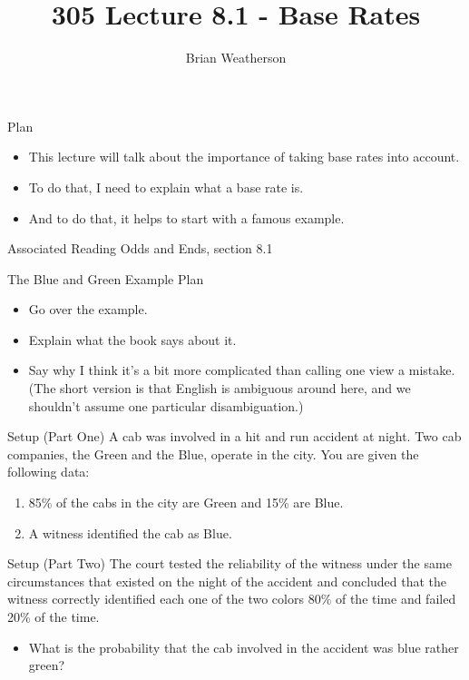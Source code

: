 \documentclass[
  ignorenonframetext,
]{beamer}
\title{305 Lecture 8.1 - Base Rates}
\author{Brian Weatherson}
\date{}
\providecommand{\tightlist}{%
  \setlength{\itemsep}{0pt}\setlength{\parskip}{0pt}}
\renewcommand{\,}{\text{, }}
\begin{document}
\frame{\titlepage}

\begin{frame}{Plan}
\protect\hypertarget{plan}{}
\begin{itemize}
\tightlist
\item
  This lecture will talk about the importance of taking base rates into
  account.
\item
  To do that, I need to explain what a base rate is.
\item
  And to do that, it helps to start with a famous example.
\end{itemize}
\end{frame}

\begin{frame}{Associated Reading}
\protect\hypertarget{associated-reading}{}
Odds and Ends, section 8.1
\end{frame}

\begin{frame}{The Blue and Green Example}
\protect\hypertarget{the-blue-and-green-example}{}
Plan

\begin{itemize}
\tightlist
\item
  Go over the example.
\item
  Explain what the book says about it.
\item
  Say why I think it's a bit more complicated than calling one view a
  mistake. (The short version is that English is ambiguous around here,
  and we shouldn't assume one particular disambiguation.)
\end{itemize}
\end{frame}

\begin{frame}{Setup (Part One)}
\protect\hypertarget{setup-part-one}{}
A cab was involved in a hit and run accident at night. Two cab
companies, the Green and the Blue, operate in the city. You are given
the following data:

\begin{enumerate}
\tightlist
\item
  85\% of the cabs in the city are Green and 15\% are Blue.
\item
  A witness identified the cab as Blue.
\end{enumerate}
\end{frame}

\begin{frame}{Setup (Part Two)}
\protect\hypertarget{setup-part-two}{}
The court tested the reliability of the witness under the same
circumstances that existed on the night of the accident and concluded
that the witness correctly identified each one of the two colors 80\% of
the time and failed 20\% of the time.

\begin{itemize}
\tightlist
\item
  What is the probability that the cab involved in the accident was blue
  rather green?
\end{itemize}
\end{frame}
\end{document}
